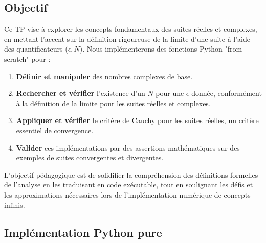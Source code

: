 \documentclass[a4paper,11pt]{report}
\begin{document}
\subsection*{Objectif}
Ce TP vise à explorer les concepts fondamentaux des suites réelles et complexes, en mettant l'accent sur la définition rigoureuse de la limite d'une suite à l'aide des quantificateurs ($\epsilon, N$). Nous implémenterons des fonctions Python "from scratch" pour :
\begin{enumerate}
\item \textbf{Définir et manipuler} des nombres complexes de base.

\item \textbf{Rechercher et vérifier} l'existence d'un $N$ pour une $\epsilon$ donnée, conformément à la définition de la limite pour les suites réelles et complexes.

\item \textbf{Appliquer et vérifier} le critère de Cauchy pour les suites réelles, un critère essentiel de convergence.

\item \textbf{Valider} ces implémentations par des assertions mathématiques sur des exemples de suites convergentes et divergentes.
\end{enumerate}

L'objectif pédagogique est de solidifier la compréhension des définitions formelles de l'analyse en les traduisant en code exécutable, tout en soulignant les défis et les approximations nécessaires lors de l'implémentation numérique de concepts infinis.

\subsection*{Implémentation Python pure}
\end{document}
